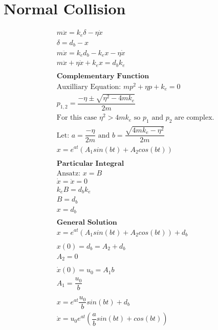 \documentclass[10pt,a4paper,titlepage]{report}
\begin{document}
\section{Normal Collision}
\label{der:normal collision}
\begin{align*}
&m \ddot{x} = k_e \delta - \eta \dot{x} \\
&\delta = d_b - x \\
&m \ddot{x} = k_e d_b - k_e x - \eta \dot{x} \\
&m \ddot{x} + \eta \dot{x} + k_e x = d_b k_e \\\\
&\textbf{Complementary Function} \\
&\text{Auxilliary Equation: } mp^2 + \eta p + k_e = 0 \\
&p_{1,2} = \dfrac{- \eta \pm \sqrt{\eta^2 - 4 m k_e}}{2 m} \\
&\text{For this case $\eta ^ 2 > 4 m k_e$ so $p_1$ and $p_2$ are complex.} \\
&\text{Let: } a = \dfrac{-\eta}{2m} \text{ and } b = \dfrac{\sqrt{4mk_e - \eta ^ 2}}{2m} \\
&x = e^{at} (A_1 sin(bt) + A_2 cos(bt)) \\\\
&\textbf{Particular Integral} \\
&\text{Ansatz: } x = B \\
&\dot{x} = \ddot{x} = 0 \\
&k_e B = d_b k_e \\
&B = d_b \\
&x = d_b \\\\
&\textbf{General Solution} \\
&x = e^{at} (A_1 sin(bt) + A_2 cos(bt)) + d_b \\\\
&x(0) = d_b = A_2 + d_b \\
&A_2 = 0 \\\\
&\dot{x}(0) = u_0 = A_1 b \\
&A_1 = \dfrac{u_0}{b} \\\\
&x = e^{at} \dfrac{u_0}{b} sin(bt) + d_b \\
&\dot{x} = u_0 e^{at} (\dfrac{a}{b} sin(bt) + cos(bt))
\end{align*}
\end{document}
